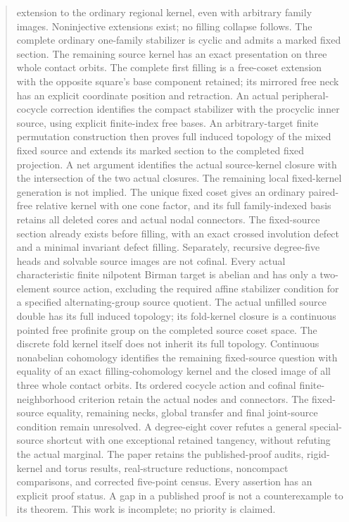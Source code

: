 \documentclass[11pt,a4paper]{article}
\begin{document}
\begin{abstract}
extension to the ordinary regional kernel, even with arbitrary family
images. Noninjective extensions exist; no filling collapse follows. The complete ordinary
one-family stabilizer is cyclic and admits a marked fixed section.
The remaining source kernel has an exact presentation on three whole
contact orbits. The complete first filling is a free-coset extension
with the opposite square's base component retained; its mirrored free
neck has an explicit coordinate position and retraction. An actual
peripheral-cocycle correction identifies the compact stabilizer with
the procyclic inner source, using explicit finite-index free bases.
An arbitrary-target finite permutation construction then proves full
induced topology of the mixed fixed source and extends its marked
section to the completed fixed projection. A net argument identifies
the actual source-kernel closure with the intersection of the two
actual closures. The remaining local fixed-kernel generation is not
implied.
The unique fixed coset gives an ordinary paired-free relative kernel
with one cone factor, and its full family-indexed basis retains all
deleted cores and actual nodal connectors. The fixed-source section
already exists before filling, with an exact crossed involution defect
and a minimal invariant defect filling. Separately, recursive degree-five
heads and solvable source images are not cofinal. Every actual
characteristic finite nilpotent Birman target is abelian and has only
a two-element source action, excluding the required affine stabilizer
condition for a specified alternating-group source quotient.
The actual unfilled source double has its full induced topology; its
fold-kernel closure is a continuous pointed free profinite group on
the completed source coset space. The discrete fold kernel itself
does not inherit its full topology. Continuous nonabelian cohomology
identifies the remaining fixed-source question with equality of an
exact filling-cohomology kernel and the closed image of all three
whole contact orbits. Its ordered cocycle action and cofinal
finite-neighborhood criterion retain the actual nodes and connectors.
The fixed-source equality, remaining necks, global transfer and final
joint-source condition remain unresolved. A degree-eight cover refutes
a general special-source shortcut with one exceptional retained
tangency, without refuting the actual marginal. The paper retains the published-proof audits, rigid-kernel
and torus results, real-structure reductions, noncompact comparisons,
and corrected five-point census. Every assertion has an explicit proof
status. A gap in a published proof is not a counterexample to its theorem.
This work is incomplete; no priority is claimed.
\end{abstract}
\tableofcontents
\clearpage
\end{document}
